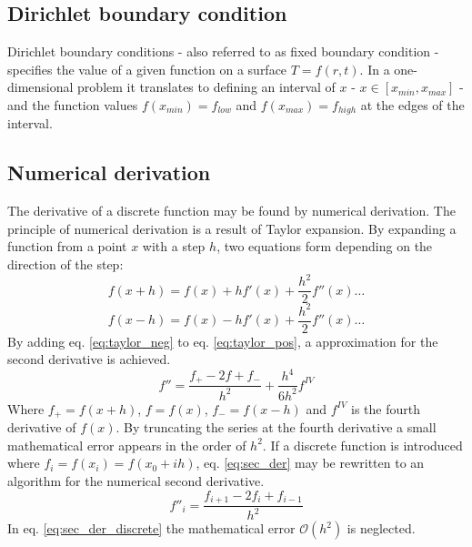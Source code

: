 \documentclass[twoside,twocolumn]{article}
\begin{document}
\subsection{Dirichlet boundary condition}
Dirichlet boundary conditions - also referred to as fixed boundary condition - specifies the value of a given function on a surface $T=f(r,t)$. In a one-dimensional problem it translates to defining an interval of $x$ - $x\in [x_{min},x_{max}]$ - and the function values $f(x_{min})=f_{low}$ and $f(x_{max})=f_{high}$ at the edges of the interval.

\subsection{Numerical derivation}
The derivative of a discrete function may be found by numerical derivation. The principle of numerical derivation is a result of Taylor expansion. By expanding a function from a point $x$ with a step $h$, two equations form depending on the direction of the step:
\begin{equation}
f(x+h) = f(x)+hf'(x)+\frac{h^2}{2}f''(x)\ldots \label{eq:taylor_pos}
\end{equation}
\begin{equation}
f(x-h) = f(x)-hf'(x)+\frac{h^2}{2}f''(x)\ldots \label{eq:taylor_neg}
\end{equation}
By adding eq. \ref{eq:taylor_neg} to eq. \ref{eq:taylor_pos}, a approximation for the second derivative is achieved.
\begin{equation}
f'' = \frac{f_+-2f+f_-}{h^2}+\frac{h^4}{6h^2}f^{\mathit{IV}}\label{eq:sec_der}
\end{equation}
Where $f_+ = f(x+h)$, $f=f(x)$, $f_-=f(x-h)$ and $f^{IV}$ is the fourth derivative of $f(x)$. By truncating the series at the fourth derivative a small mathematical error appears in the order of $h^2$. If a discrete function is introduced where $f_i = f(x_i) = f(x_0+ih)$, eq. \ref{eq:sec_der} may be rewritten to an algorithm for the numerical second derivative.
\begin{equation}
f''_i = \frac{f_{i+1}-2f_i+f_{i-1}}{h^2}\label{eq:sec_der_discrete}
\end{equation}
In eq. \ref{eq:sec_der_discrete} the mathematical error $\mathcal{O}(h^2)$ is neglected.
\end{document}
